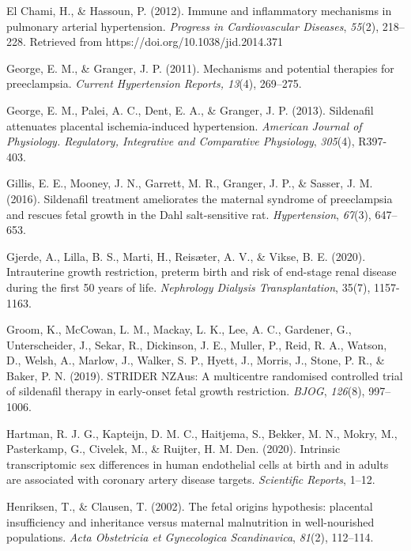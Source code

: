 \documentclass[authordate, empirical]{jote-new-article}
\begin{document}
	El Chami, H., \& Hassoun, P. (2012). Immune and inflammatory mechanisms in pulmonary arterial hypertension. \emph{Progress in Cardiovascular Diseases},\emph{ 55}(2), 218--228. Retrieved from https://doi.org/10.1038/jid.2014.371



	George, E. M., \& Granger, J. P. (2011). Mechanisms and potential therapies for preeclampsia. \emph{Current Hypertension Reports, 13}(4), 269--275.



	George, E. M., Palei, A. C., Dent, E. A., \& Granger, J. P. (2013). Sildenafil attenuates placental ischemia-induced hypertension. \emph{American Journal of Physiology. Regulatory, Integrative and Comparative Physiology},\emph{ 305}(4), R397-403.



	Gillis, E. E., Mooney, J. N., Garrett, M. R., Granger, J. P., \& Sasser, J. M. (2016). Sildenafil treatment ameliorates the maternal syndrome of preeclampsia and rescues fetal growth in the Dahl salt-sensitive rat. \emph{Hypertension}, \emph{67}(3), 647--653.



	Gjerde, A., Lilla, B. S., Marti, H., Reisæter, A. V., \& Vikse, B. E. (2020). Intrauterine growth restriction, preterm birth and risk of end-stage renal disease during the first 50 years of life. \emph{Nephrology Dialysis Transplantation}, 35(7), 1157-1163.



	Groom, K., McCowan, L. M., Mackay, L. K., Lee, A. C., Gardener, G., Unterscheider, J., Sekar, R., Dickinson, J. E., Muller, P., Reid, R. A., Watson, D., Welsh, A., Marlow, J., Walker, S. P., Hyett, J., Morris, J., Stone, P. R., \& Baker, P. N. (2019). STRIDER NZAus: A multicentre randomised controlled trial of sildenafil therapy in early-onset fetal growth restriction. \emph{BJOG},\emph{ 126}(8), 997--1006.



	Hartman, R. J. G., Kapteijn, D. M. C., Haitjema, S., Bekker, M. N., Mokry, M., Pasterkamp, G., Civelek, M., \& Ruijter, H. M. Den. (2020). Intrinsic transcriptomic sex differences in human endothelial cells at birth and in adults are associated with coronary artery disease targets. \emph{Scientific Reports}, 1--12.



	Henriksen, T., \& Clausen, T. (2002). The fetal origins hypothesis: placental insufficiency and inheritance versus maternal malnutrition in well-nourished populations. \emph{Acta Obstetricia et Gynecologica Scandinavica}, \emph{81}(2), 112--114.
\end{document}
